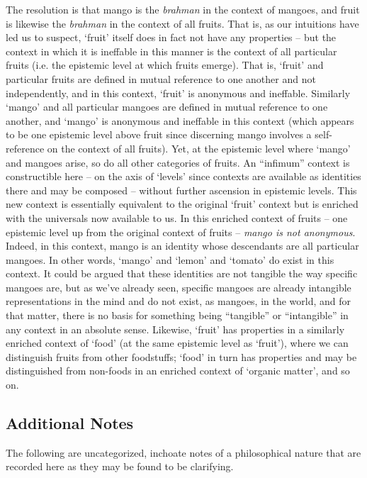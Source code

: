 \documentclass[pra,twocolumn,groupedaddress,10pt]{revtex4}
\theoremstyle{definition}
\begin{document}
The resolution is that mango is the \emph{brahman} in the context of mangoes, and fruit is likewise the \emph{brahman} in the context of all fruits. That is, as our intuitions have led us to suspect, `fruit' itself does in fact not have any properties -- but the context in which it is ineffable in this manner is the context of all particular fruits (i.e. the epistemic level at which fruits emerge). That is, `fruit' and particular fruits are defined in mutual reference to one another and not independently, and in this context, `fruit' is anonymous and ineffable. Similarly `mango' and all particular mangoes are defined in mutual reference to one another, and `mango' is anonymous and ineffable in this context (which appears to be one epistemic level above fruit since discerning mango involves a self-reference on the context of all fruits). Yet, at the epistemic level where `mango' and mangoes arise, so do all other categories of fruits. An ``infimum'' context is constructible here -- on the axis of `levels' since contexts are available as identities there and may be composed -- without further ascension in epistemic levels. This new context is essentially equivalent to the original `fruit' context but is enriched with the universals now available to us. In this enriched context of fruits -- one epistemic level up from the original context of fruits -- \emph{mango is not anonymous}. Indeed, in this context, mango is an identity whose descendants are all particular mangoes. In other words, `mango' and `lemon' and `tomato' do exist in this context. It could be argued that these identities are not tangible the way specific mangoes are, but as we've already seen, specific mangoes are already intangible representations in the mind and do not exist, as mangoes, in the world, and for that matter, there is no basis for something being ``tangible'' or ``intangible'' in any context in an absolute sense. Likewise, `fruit' has properties in a similarly enriched context of `food' (at the same epistemic level as `fruit'), where we can distinguish fruits from other foodstuffs; `food' in turn has properties and may be distinguished from non-foods in an enriched context of `organic matter', and so on.

\subsection{Additional Notes}

The following are uncategorized, inchoate notes of a philosophical nature that are recorded here as they may be found to be clarifying.
\end{document}
